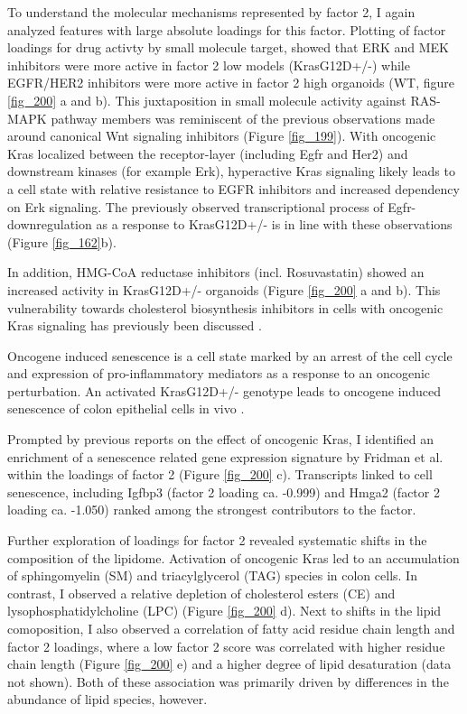 \begin{flushleft}
\bigbreak
To understand the molecular mechanisms represented by factor 2, I again analyzed features with large absolute loadings for this factor. Plotting of factor loadings for drug activty by small molecule target, showed that ERK and MEK inhibitors were more active in factor 2 low models (KrasG12D+/-) while EGFR/HER2 inhibitors were more active in factor 2 high organoids (WT, figure \ref{fig_200} a and b). This juxtaposition in small molecule activity against RAS-MAPK pathway members was reminiscent of the previous observations made around canonical Wnt signaling inhibitors (Figure \ref{fig_199}). With oncogenic Kras localized between the receptor-layer (including Egfr and Her2) and downstream kinases (for example Erk), hyperactive Kras signaling likely leads to a cell state with relative resistance to EGFR inhibitors and increased dependency on Erk signaling. The previously observed transcriptional process of Egfr-downregulation as a response to KrasG12D+/- is in line with these observations (Figure \ref{fig_162}b).

\smallbreak

In addition, HMG-CoA reductase inhibitors (incl. Rosuvastatin) showed an increased activity in KrasG12D+/- organoids (Figure \ref{fig_200} a and b). This vulnerability towards cholesterol biosynthesis inhibitors in cells with oncogenic Kras signaling has previously been discussed \cite{Yu2018-he}. 

\smallbreak
Oncogene induced senescence is a cell state marked by an arrest of the cell cycle and expression of pro-inflammatory mediators as a response to an oncogenic perturbation. An activated KrasG12D+/- genotype leads to oncogene induced senescence of colon epithelial cells in vivo \cite{Bennecke2010-zf}. 

\smallbreak
Prompted by previous reports on the effect of oncogenic Kras, I identified an enrichment of a senescence related gene expression signature by Fridman et al. within the loadings of factor 2 
\cite{Fridman2008-ky} (Figure \ref{fig_200} c). Transcripts linked to cell senescence, including Igfbp3 (factor 2 loading ca. -0.999) and Hmga2 (factor 2 loading ca. -1.050) ranked among the strongest contributors to the factor. 

\smallbreak
Further exploration of loadings for factor 2 revealed systematic shifts in the composition of the lipidome. Activation of oncogenic Kras led to an accumulation of sphingomyelin (SM) and triacylglycerol (TAG) species in colon cells. In contrast, I observed a relative depletion of cholesterol esters (CE) and lysophosphatidylcholine (LPC) (Figure \ref{fig_200} d). Next to shifts in the lipid comoposition, I also observed a correlation of fatty acid residue chain length and factor 2 loadings, where a low factor 2 score was correlated with higher residue chain length (Figure \ref{fig_200} e) and a higher degree of lipid desaturation (data not shown). Both of these association was primarily driven by differences in the abundance of lipid species, however. 


\end{flushleft}
